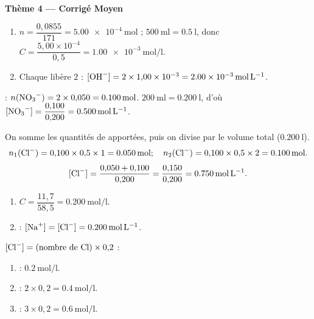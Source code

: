 \documentclass[11pt,a4paper]{article}
\begin{document}
\begin{center}{\large\bfseries\color{primarydark} Thème 4 — Corrigé Moyen}\end{center}

\begin{corrige}
\begin{enumerate}[label=\alph*)]
  \item $n = \dfrac{0{,}0855}{171} = \SI{5.00e-4}{\mole}$ ; $\SI{500}{\milli\litre} = \SI{0.5}{\litre}$, donc
        $C = \dfrac{5{,}00\times10^{-4}}{0{,}5} = \SI{1.00e-3}{\mole\per\litre}$.
  \item Chaque  libère $2$  : $[\ce{OH-}] = 2\times 1{,}00\times10^{-3}
        = \SI{2.00e-3}{\mole\per\litre}$.
\end{enumerate}
\end{corrige}

\begin{corrige}
 : $n(\ce{NO3-}) = 2\times 0{,}050 = \SI{0.100}{\mole}$.
$\SI{200}{\milli\litre} = \SI{0.200}{\litre}$, d'où $[\ce{NO3-}] = \dfrac{0{,}100}{0{,}200} = \SI{0.500}{\mole\per\litre}$.
\end{corrige}

\begin{corrige}
On somme les quantités de  apportées, puis on divise par le volume total ($\SI{0.200}{\litre}$).
\[ n_1(\ce{Cl-}) = 0{,}100\times 0{,}5\times 1 = \SI{0.050}{\mole};\quad
   n_2(\ce{Cl-}) = 0{,}100\times 0{,}5\times 2 = \SI{0.100}{\mole}. \]
\[ [\ce{Cl-}] = \frac{0{,}050+0{,}100}{0{,}200} = \frac{0{,}150}{0{,}200} = \SI{0.750}{\mole\per\litre}. \]
\end{corrige}

\begin{corrige}
\begin{enumerate}[label=\alph*)]
  \item $C = \dfrac{11{,}7}{58{,}5} = \SI{0.200}{\mole\per\litre}$.
  \item {} : $[\ce{Na+}] = [\ce{Cl-}] = \SI{0.200}{\mole\per\litre}$.
\end{enumerate}
\end{corrige}

\begin{corrige}
$[\ce{Cl-}] = (\text{nombre de \ce{Cl}})\times 0{,}2$ :
\begin{enumerate}[label=\alph*)]
  \item {} : $\SI{0.2}{\mole\per\litre}$.
  \item {} : $2\times 0{,}2 = \SI{0.4}{\mole\per\litre}$.
  \item {} : $3\times 0{,}2 = \SI{0.6}{\mole\per\litre}$.
\end{enumerate}
\end{corrige}
\end{document}
